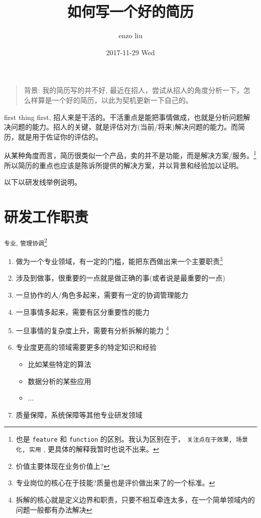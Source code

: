 \documentclass[11pt,a4paper]{article}
\author{enzo liu}
\date{2017-11-29 Wed}
\title{如何写一个好的简历}
\begin{document}
\maketitle
\begin{quote}
背景: 我的简历写的并不好, 最近在招人，尝试从招人的角度分析一下，怎么样算是一个好的简历，以此为契机更新一下自己的。
\end{quote}

first thing first, 招人来是干活的。干活重点是能把事情做成，也就是分析问题解决问题的能力。招人的关键，就是评估对方(当前/将来)解决问题的能力。而简历，就是用于佐证你的评估的。

从某种角度而言，简历很类似一个产品，卖的并不是功能，而是解决方案/服务。\footnote{也是 \texttt{feature} 和 \texttt{function} 的区别。我认为区别在于， \texttt{关注点在于效果, 场景化, 实用} , 更具体的解释我暂时也说不出来。} 所以简历的重点也应该是陈诉所提供的解决方案，并以背景和经验加以证明。

以下以研发线举例说明。

\section*{研发工作职责}
\label{sec:orgb0f1f92}
\texttt{专业}, \texttt{管理协调}\footnote{价值主要体现在业务价值上?}

\begin{enumerate}
\item 做为一个专业领域，有一定的门槛，能把东西做出来一个主要职责\footnote{专业岗位的核心在于技能?质量也是评价做出来了的一个标准。}
\item 涉及到做事，很重要的一点就是做正确的事(或者说是最重要的一点)
\item 一旦协作的人/角色多起来，需要有一定的协调管理能力
\item 一旦事情多起来，需要有区分重要性的能力
\item 一旦事情的复杂度上升，需要有分析拆解的能力 \footnote{拆解的核心就是定义边界和职责，只要不相互牵连太多，在一个简单领域内的问题一般都有办法解决}
\item 专业度更高的领域需要更多的特定知识和经验
\begin{itemize}
\item 比如某些特定的算法
\item 数据分析的某些应用
\item ...
\end{itemize}
\item 质量保障，系统保障等其他专业研发领域
\end{enumerate}
\end{document}
